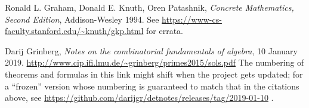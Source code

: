 \documentclass[paper=a4, fontsize=12pt]{scrartcl}%
\theoremstyle{plainsl}
\theoremstyle{definition}
\theoremstyle{remark}
\begin{document}
\begin{thebibliography}{99999999}                                                                                         %






Ronald L. Graham, Donald E. Knuth, Oren Patashnik,
\textit{Concrete Mathematics, Second Edition}, Addison-Wesley 1994.\newline
See \url{https://www-cs-faculty.stanford.edu/~knuth/gkp.html} for errata.

Darij Grinberg, \textit{Notes on the combinatorial
fundamentals of algebra}, 10 January 2019. \newline%
\url{http://www.cip.ifi.lmu.de/~grinberg/primes2015/sols.pdf} \newline The
numbering of theorems and formulas in this link might shift when the project
gets updated; for a ``frozen'' version whose numbering is guaranteed to match
that in the citations above, see
\url{https://github.com/darijgr/detnotes/releases/tag/2019-01-10} .
\end{thebibliography}
\end{document}
